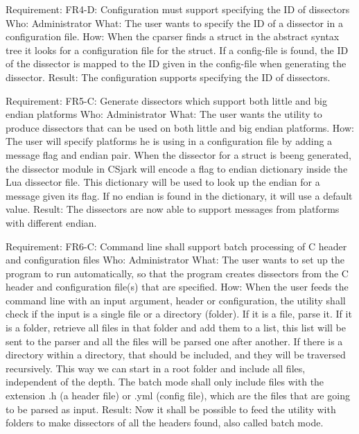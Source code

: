 Requirement: FR4-D: Configuration must support specifying the ID of dissectors 
Who: Administrator
What: The user wants to specify the ID of a dissector in a configuration file.
How: When the cparser finds a struct in the abstract syntax tree it looks for a configuration file for the struct. If a config-file is found, the ID of the dissector is mapped to the ID given in the config-file when generating the dissector.
Result: The configuration supports specifying the ID of dissectors.

Requirement: FR5-C: Generate dissectors which support both little and big endian platforms
Who: Administrator
What: The user wants the utility to produce dissectors that can be used on both little and big endian platforms.
How: The user will specify platforms he is using in a configuration file by adding a message flag and endian pair. When the dissector for a struct is beeng generated, the dissector module in CSjark will encode a flag to endian dictionary inside the Lua dissector file. This dictionary will be used to look up the endian for a message given its flag. If no endian is found in the dictionary, it will use a default value.
Result: The dissectors are now able to support messages from platforms with different endian.

Requirement: FR6-C: Command line shall support batch processing of C header and configuration files
Who: Administrator
What: The user wants to set up the program to run automatically, so that the program creates dissectors from the C header and configuration file(s) that are specified.
How: When the user feeds the command line with an input argument, header or configuration, the utility shall check if the input is a single file or a directory (folder). If it is a file, parse it. If it is a folder, retrieve all files in that folder and add them to a list, this list will be sent to the parser and all the files will be parsed one after another. If there is a directory within a directory, that should be included, and they will be traversed recursively. This way we can start in a root folder and include all files, independent of the depth. The batch mode shall only include files with the extension .h (a header file) or .yml (config file), which are the files that are going to be parsed as input.    
Result: Now it shall be possible to feed the utility with folders to make dissectors of all the headers found, also called batch mode.





